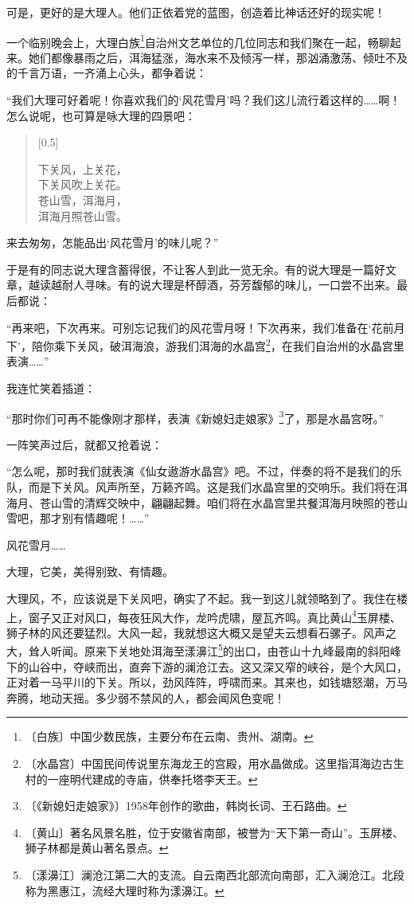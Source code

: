 \documentclass[12pt,UTF-8,openany]{ctexbook}
\begin{document}
\begin{large}
    可是，更好的是大理人。他们正依着党的蓝图，创造着比神话还好的现实呢！
    
    一个临别晚会上，大理白族\footnote{〔白族〕中国少数民族，主要分布在云南、贵州、湖南。}自治州文艺单位的几位同志和我们聚在一起，畅聊起来。她们都像暴雨之后，洱海猛涨，海水来不及倾泻一样，那汹涌激荡、倾吐不及的千言万语，一齐涌上心头，都争着说：
    
    “我们大理可好着呢！你喜欢我们的‘风花雪月’吗？我们这儿流行着这样的……啊！怎么说呢，也可算是咏大理的四景吧：
    
    \begin{verse}[0.5\linewidth]
    
    下关风，上关花，\\ 下关风吹上关花。\\苍山雪，洱海月，\\洱海月照苍山雪。
    
    \end{verse}
    
    来去匆匆，怎能品出‘风花雪月’的味儿呢？”
    
    于是有的同志说大理含蓄得很，不让客人到此一览无余。有的说大理是一篇好文章，越读越耐人寻味。有的说大理是杯醇酒，芬芳馥郁的味儿，一口尝不出来。最后都说：
    
    “再来吧，下次再来。可别忘记我们的风花雪月呀！下次再来，我们准备在‘花前月下’，陪你乘下关风，破洱海浪，游我们洱海的水晶宫\footnote{〔水晶宫〕中国民间传说里东海龙王的宫殿，用水晶做成。这里指洱海边古生村的一座明代建成的寺庙，供奉托塔李天王。}，在我们自治州的水晶宫里表演……”
    
    我连忙笑着插道：
    
    “那时你们可再不能像刚才那样，表演《新媳妇走娘家》\footnote{〔《新媳妇走娘家》〕1958年创作的歌曲，韩岗长词、王石路曲。}了，那是水晶宫呀。”
    
    一阵笑声过后，就都又抢着说：
    
    “怎么呢，那时我们就表演《仙女遨游水晶宫》吧。不过，伴奏的将不是我们的乐队，而是下关风。风声所至，万籁齐鸣。这是我们水晶宫里的交响乐。我们将在洱海月、苍山雪的清辉交映中，翩翩起舞。咱们将在水晶宫里共餐洱海月映照的苍山雪吧，那才别有情趣呢！……”
    
    风花雪月……
    
    大理，它美，美得别致、有情趣。
    
    大理风，不，应该说是下关风吧，确实了不起。我一到这儿就领略到了。我住在楼上，窗子又正对风口，每夜狂风大作，龙吟虎啸，屋瓦齐鸣。真比黄山\footnote{〔黄山〕著名风景名胜，位于安徽省南部，被誉为“天下第一奇山”。玉屏楼、狮子林都是黄山著名景点。}玉屏楼、狮子林的风还要猛烈。大风一起，我就想这大概又是望夫云想看石骡子。风声之大，耸人听闻。原来下关地处洱海至漾濞江\footnote{〔漾濞江〕澜沧江第二大的支流。自云南西北部流向南部，汇入澜沧江。北段称为黑惠江，流经大理时称为漾濞江。}的出口，由苍山十九峰最南的斜阳峰下的山谷中，夺峡而出，直奔下游的澜沧江去。这又深又窄的峡谷，是个大风口，正对着一马平川的下关。所以，劲风阵阵，呼啸而来。其来也，如钱塘怒潮，万马奔腾，地动天摇。多少弱不禁风的人，都会闻风色变呢！
    

\end{large}
\end{document}
